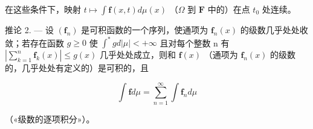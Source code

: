 在这些条件下，映射 \(t \mapsto \int \mathbf{f}(x,t) d\mu(x)\) （\(\Omega\) 到 \(\mathbf{F}\) 中的）在点 \(t_0\) 处连续。

推论 2. --- 设 \((\mathbf{f}_{n})\) 是可积函数的一个序列，使通项为 \(\mathbf{f}_{n}(x)\) 的级数几乎处处收敛；若存在函数 \(g \geqslant 0\) 使 \(\int^{*} g d|\mu| < +\infty\) 且对每个整数 n 有 \(\left|\sum_{k=1}^{n} \mathbf{f}_{k}(x)\right| \leqslant g(x)\) 几乎处处成立，则和 \(\mathbf{f}(x)\) （通项为 \(\mathbf{f}_{n}(x)\) 的级数的，几乎处处有定义的）是可积的，且

\[
\int \mathbf {f} d \mu = \sum_ {n = 1} ^ {\infty} \int \mathbf {f} _ {n} d \mu\tag{12}
\]

（«级数的逐项积分»）。

